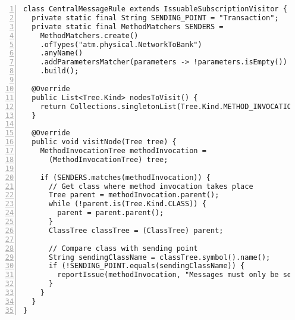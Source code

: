 \begin{lstlisting}[caption={Constraint 3.}, captionpos=b, label=lst:sq_3, numbers=left, showstringspaces=false]
class CentralMessageRule extends IssuableSubscriptionVisitor {
  private static final String SENDING_POINT = "Transaction";
  private static final MethodMatchers SENDERS =
    MethodMatchers.create()
    .ofTypes("atm.physical.NetworkToBank")
    .anyName()
    .addParametersMatcher(parameters -> !parameters.isEmpty())
    .build();

  @Override
  public List<Tree.Kind> nodesToVisit() {
    return Collections.singletonList(Tree.Kind.METHOD_INVOCATION);
  }

  @Override
  public void visitNode(Tree tree) {
    MethodInvocationTree methodInvocation =
      (MethodInvocationTree) tree;

    if (SENDERS.matches(methodInvocation)) {
      // Get class where method invocation takes place
      Tree parent = methodInvocation.parent();
      while (!parent.is(Tree.Kind.CLASS)) {
        parent = parent.parent();
      }
      ClassTree classTree = (ClassTree) parent;

      // Compare class with sending point
      String sendingClassName = classTree.symbol().name();
      if (!SENDING_POINT.equals(sendingClassName)) {
        reportIssue(methodInvocation, "Messages must only be sent from the sending point");
      }
    }
  }
}
\end{lstlisting}

